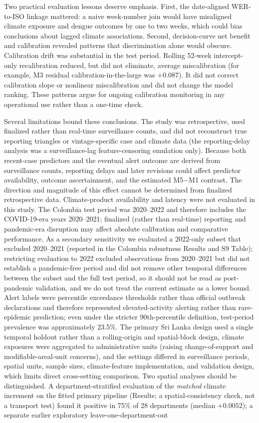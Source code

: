 \documentclass[11pt,a4paper]{article}
\begin{document}
Two practical evaluation lessons deserve emphasis. First, the date-aligned WER-to-ISO linkage mattered: a naive week-number join would have misaligned climate exposure and dengue outcomes by one to two weeks, which could bias conclusions about lagged climate associations. Second, decision-curve net benefit and calibration revealed patterns that discrimination alone would obscure. Calibration drift was substantial in the test period. Rolling 52-week intercept-only recalibration reduced, but did not eliminate, average miscalibration (for example, M3 residual calibration-in-the-large was $+0.087$). It did not correct calibration slope or nonlinear miscalibration and did not change the model ranking. These patterns argue for ongoing calibration monitoring in any operational use rather than a one-time check.

Several limitations bound these conclusions. The study was retrospective, used finalized rather than real-time surveillance counts, and did not reconstruct true reporting triangles or vintage-specific case and climate data (the reporting-delay analysis was a surveillance-lag feature-censoring emulation only). Because both recent-case predictors and the eventual alert outcome are derived from surveillance counts, reporting delays and later revisions could affect predictor availability, outcome ascertainment, and the estimated M5$-$M1 contrast. The direction and magnitude of this effect cannot be determined from finalized retrospective data. Climate-product availability and latency were not evaluated in this study. The Colombia test period was 2020--2022 and therefore includes the COVID-19-era years 2020--2021; finalized (rather than real-time) reporting and pandemic-era disruption may affect absolute calibration and comparative performance. As a secondary sensitivity we evaluated a 2022-only subset that excluded 2020--2021 (reported in the Colombia robustness Results and S9 Table); restricting evaluation to 2022 excluded observations from 2020--2021 but did not establish a pandemic-free period and did not remove other temporal differences between the subset and the full test period, so it should not be read as post-pandemic validation, and we do not treat the current estimate as a lower bound. Alert labels were percentile exceedance thresholds rather than official outbreak declarations and therefore represented elevated-activity alerting rather than rare-epidemic prediction; even under the stricter 90th-percentile definition, test-period prevalence was approximately 23.5\%. The primary Sri Lanka design used a single temporal holdout rather than a rolling-origin and spatial-block design, climate exposures were aggregated to administrative units (raising change-of-support and modifiable-areal-unit concerns), and the settings differed in surveillance periods, spatial units, sample sizes, climate-feature implementation, and validation design, which limits direct cross-setting comparison. Two spatial analyses should be distinguished. A department-stratified evaluation of the \emph{matched} climate increment on the fitted primary pipeline (Results; a spatial-consistency check, not a transport test) found it positive in 75\% of 28 departments (median $+0.0052$); a separate earlier exploratory leave-one-department-out 
\end{document}
